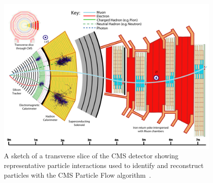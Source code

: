 \begin{figure}
\centering
\includegraphics[width=\textwidth]{figures/lhc_and_cms/cms_slice.pdf}
\caption{A sketch of a transverse slice of the CMS detector showing representative particle interactions used to identify and reconstruct particles with the CMS Particle Flow algorithm~\cite{cms_pf}.}
\label{cms_slice}
\end{figure}